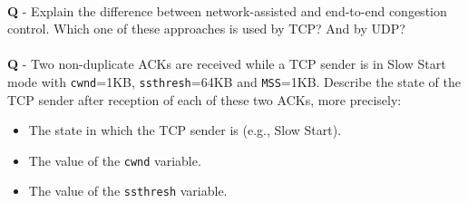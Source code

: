 \documentclass{llncs}
\newcounter{ques}
\renewcommand{\question}[1]{\paragraph{}\textbf{Q\theques} - #1\stepcounter{ques} }
\newcommand{\answer}[1]{}%
\begin{document}
\newpage


\question{Explain the difference between network-assisted and end-to-end
  congestion control. Which one of these approaches is used by TCP? And by UDP?}

\answer{See slide 95 in Chapter 3. In network-assisted congestion
  control, the routers are responsible for congestion detection and
  send feedback to the senders. In end-to-end congestion control, the
  senders themselves infer congestion status based on packet losses
  and delays, without receiving any explicit feedback from the
  network. TCP adopts an end-to-end approach to congestion
  control. UDP doesn't have any congestion control mechanism.}

\newpage



\question{Two non-duplicate ACKs are received while a TCP sender is in Slow Start mode with \texttt{cwnd}=1KB, \texttt{ssthresh}=64KB and \texttt{MSS}=1KB. Describe the state of the TCP sender after reception of each of these two ACKs, more precisely:
  \begin{itemize}
  \item The state in which the TCP sender is (e.g., Slow Start).
  \item The value of the \texttt{cwnd} variable.
  \item The value of the \texttt{ssthresh} variable.
  \end{itemize}
}

\answer{See slide 104 in Chapter 3. \texttt{cwnd} is increased by 1 MSS after each ACK is received. \texttt{ssthresh} doesn't change. TCP remains in Slow Start mode.}
\end{document}

